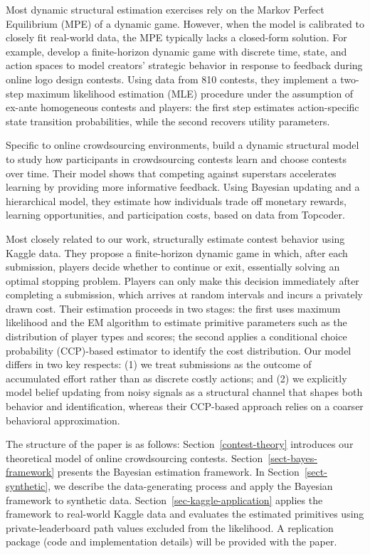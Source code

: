 \documentclass[mnsc]{informs3}
\begin{document}
Most dynamic structural estimation exercises rely on the Markov Perfect Equilibrium (MPE) of a dynamic game.
However, when the model is calibrated to closely fit real-world data, the MPE typically lacks a closed-form solution.
For example, \citet{jiang2022feedback} develop a finite-horizon dynamic game with discrete time, state, and action spaces to model creators’ strategic behavior in response to feedback during online logo design contests.
Using data from 810 contests, they implement a two-step maximum likelihood estimation (MLE) procedure under the assumption of ex-ante homogeneous contests and players: the first step estimates action-specific state transition probabilities, while the second recovers utility parameters.

Specific to online crowdsourcing environments,
\citet{zhang2019structural} build a dynamic structural model to study how participants in crowdsourcing contests learn and choose contests over time.
Their model shows that competing against superstars accelerates learning by providing more informative feedback.
Using Bayesian updating and a hierarchical model, they estimate how individuals trade off monetary rewards, learning opportunities, and participation costs, based on data from Topcoder.

Most closely related to our work, \citet{lemus2021dynamic} structurally estimate contest behavior using Kaggle data.
They propose a finite-horizon dynamic game in which, after each submission, players decide whether to continue or exit, essentially solving an optimal stopping problem.
Players can only make this decision immediately after completing a submission, which arrives at random intervals and incurs a privately drawn cost.
Their estimation proceeds in two stages: the first uses maximum likelihood and the EM algorithm to estimate primitive parameters such as the distribution of player types and scores; the second applies a conditional choice probability (CCP)-based estimator to identify the cost distribution.
Our model differs in two key respects:
(1) we treat submissions as the outcome of accumulated effort rather than as discrete costly actions; and
(2) we explicitly model belief updating from noisy signals as a structural channel that shapes both behavior and identification, whereas their CCP-based approach relies on a coarser behavioral approximation.







The structure of the paper is as follows:
Section~\ref{contest-theory} introduces our theoretical model of online crowdsourcing contests.
Section~\ref{sect-bayes-framework} presents the Bayesian estimation framework.
In Section~\ref{sect-synthetic}, we describe the data-generating process and apply the Bayesian framework to synthetic data.
Section~\ref{sec-kaggle-application} applies the framework to real-world Kaggle data and evaluates the estimated primitives using private-leaderboard path values excluded from the likelihood.
A replication package (code and implementation details) will be provided with the paper.
\end{document}
